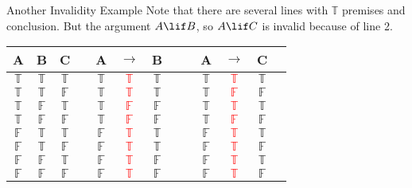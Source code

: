 \documentclass[
  ignorenonframetext,
]{beamer}
\renewcommand{\,}{\text{, }}
\def\True{\mathbb{T}}
\def\False{\mathbb{F}}
\begin{document}
\begin{frame}{Another Invalidity Example}
\protect\hypertarget{another-invalidity-example}{}
Note that there are several lines with \(\True\) premises and
conclusion. But the argument \(A \lif B\), so \(A \lif C\) is invalid
because of line 2.

\begin{center}

\begin{tabular}{@{ }c@{ }@{ }c@{ }@{ }c | c@{ }@{ }c@{ }@{ }c@{ }@{ }c@{ }@{ }c | c@{ }@{ }c@{ }@{ }c@{ }@{ }c@{ }@{ }c}
A & B & C &  & A & $\rightarrow$ & B &  &  & A & $\rightarrow$ & C & \\
\hline 
$\True$ & $\True$ & $\True$ &  & $\True$ & \textcolor{red}{$\True$} & $\True$ &  &  & $\True$ & \textcolor{red}{$\True$} & $\True$ & \\
$\True$ & $\True$ & $\False$ &  & $\True$ & \textcolor{red}{$\True$} & $\True$ &  &  & $\True$ & \textcolor{red}{$\False$} & $\False$ & \\
$\True$ & $\False$ & $\True$ &  & $\True$ & \textcolor{red}{$\False$} & $\False$ &  &  & $\True$ & \textcolor{red}{$\True$} & $\True$ & \\
$\True$ & $\False$ & $\False$ &  & $\True$ & \textcolor{red}{$\False$} & $\False$ &  &  & $\True$ & \textcolor{red}{$\False$} & $\False$ & \\
$\False$ & $\True$ & $\True$ &  & $\False$ & \textcolor{red}{$\True$} & $\True$ &  &  & $\False$ & \textcolor{red}{$\True$} & $\True$ & \\
$\False$ & $\True$ & $\False$ &  & $\False$ & \textcolor{red}{$\True$} & $\True$ &  &  & $\False$ & \textcolor{red}{$\True$} & $\False$ & \\
$\False$ & $\False$ & $\True$ &  & $\False$ & \textcolor{red}{$\True$} & $\False$ &  &  & $\False$ & \textcolor{red}{$\True$} & $\True$ & \\
$\False$ & $\False$ & $\False$ &  & $\False$ & \textcolor{red}{$\True$} & $\False$ &  &  & $\False$ & \textcolor{red}{$\True$} & $\False$ & \\
\end{tabular}
\end{center}
\end{frame}
\end{document}

